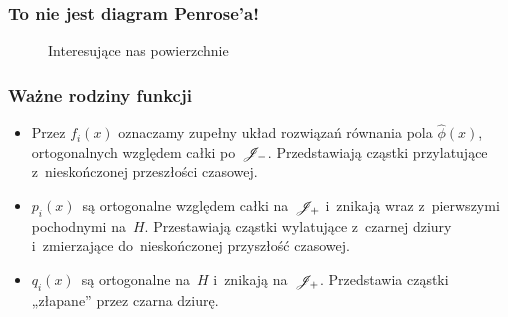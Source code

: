 \documentclass[10pt,t]{beamer}
\begin{document}
\begin{frame}
  \frametitle{To nie jest diagram Penrose’a!}


  \begin{figure}[h]

    \centering


    \caption{Interesujące nas powierzchnie}

  \end{figure}

\end{frame}





\begin{frame}
  \frametitle{Ważne rodziny funkcji}


  \begin{itemize}
    \RaggedRight

  \item Przez $f_{ i }( x )$ oznaczamy zupełny układ rozwiązań
    równania pola $\widehat{ \phi }( x )$, ortogonalnych względem
    całki po~$\mathcal{J}_{ - }$. Przedstawiają cząstki przylatujące
    z~nieskończonej przeszłości czasowej.

  \item $p_{ i }( x )$~są ortogonalne względem całki
    na~$\mathcal{J}_{ + }$ i~znikają wraz z~pierwszymi pochodnymi
    na~$H$. Przestawiają cząstki wylatujące z~czarnej dziury
    i~zmierzające do~nieskończonej przyszłość czasowej.

  \item $q_{ i }( x )$~są ortogonalne na~$H$ i~znikają
    na~$\mathcal{J}_{ + }$. Przedstawia cząstki „złapane” przez czarna
    dziurę.

  \end{itemize}

\end{frame}
\end{document}
